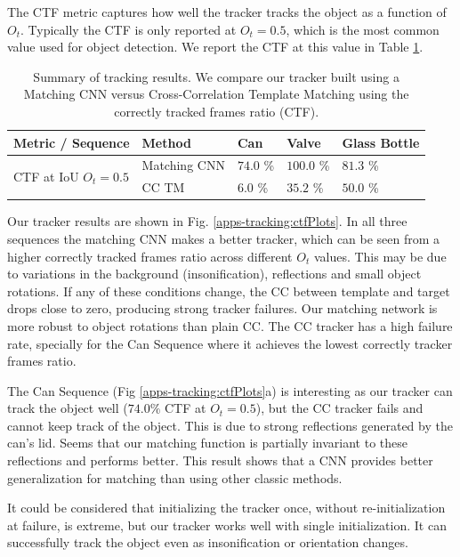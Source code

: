 The CTF metric captures how well the tracker tracks the object as a function of $O_t$. Typically the CTF is only reported at $O_t = 0.5$, which is the most common value used for object detection. We report the CTF at this value in Table \ref{apps-track:trackingSummary}.

\begin{table}[t]
	\begin{tabular}{lllll}
		\hline
		Metric / Sequence 						& Method		& Can 			& Valve 	& Glass Bottle\\
		\hline
		\multirow{2}{*}{CTF at IoU $O_t = 0.5$} & Matching CNN	& $\mathbf{74.0}$ \%	& $\mathbf{100.0}$ \%	& $\mathbf{81.3}$ \% \\
					   						    & CC TM			& $6.0$ \%	& $35.2$ \%		& $50.0$ \% \\
		\hline
	\end{tabular}
    \vspace*{0.5cm}
	\caption[Summary of tracking results]{Summary of tracking results. We compare our tracker built using a Matching CNN versus Cross-Correlation Template Matching using the correctly tracked frames ratio (CTF).}
	\label{apps-track:trackingSummary}
\end{table}

Our tracker results are shown in Fig. \ref{apps-tracking:ctfPlots}. In all three sequences the matching CNN makes a better tracker, which can be seen from a higher correctly tracked frames ratio across different $O_t$ values.
This may be due to variations in the background (insonification), reflections and small object rotations. If any of these conditions change, the CC between template and target drops close to zero, producing strong tracker failures. Our matching network is more robust to object rotations than plain CC.  The CC tracker has a high failure rate, specially for the Can Sequence where it achieves the lowest correctly tracker frames ratio. 

The Can Sequence (Fig \ref{apps-tracking:ctfPlots}a) is interesting as our tracker can track the object well ($74.0 \%$ CTF at $O_t = 0.5$), but the CC tracker fails and cannot keep track of the object. This is due to strong reflections generated by the can's lid. Seems that our matching function is partially invariant to these reflections and performs better. This result shows that a CNN provides better generalization for matching than using other classic methods.

It could be considered that initializing the tracker once, without re-initialization at failure, is extreme, but our tracker works well with single initialization. It can successfully track the object even as insonification or orientation changes.


